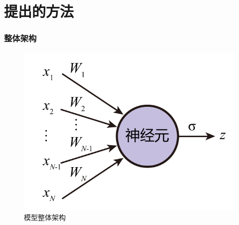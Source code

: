 \documentclass{ctexbeamer}
\begin{document}
\section{提出的方法}
\begin{frame}
  \frametitle{整体架构}
  \begin{figure}
    \includegraphics[page=6,width=\linewidth]{figure/figures.pdf}
    \caption{模型整体架构}
  \end{figure}
\end{frame}
\end{document}
